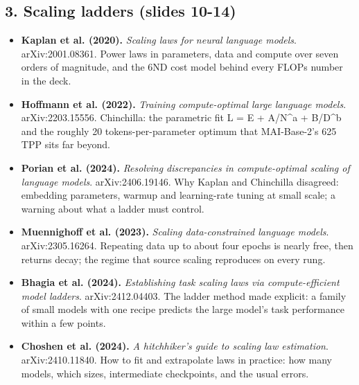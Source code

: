 \documentclass[11pt,letterpaper]{article}
\begin{document}
\subsection*{3. Scaling ladders (slides 10-14)}
\begin{itemize}[leftmargin=1.2em,itemsep=3pt]\sloppy
\item \textbf{Kaplan et al. (2020).} \textit{Scaling laws for neural language models}. arXiv:2001.08361. Power laws in parameters, data and compute over seven orders of magnitude, and the 6ND cost model behind every FLOPs number in the deck.
\item \textbf{Hoffmann et al. (2022).} \textit{Training compute-optimal large language models}. arXiv:2203.15556. Chinchilla: the parametric fit L = E + A/N\^{}a + B/D\^{}b and the roughly 20 tokens-per-parameter optimum that MAI-Base-2's 625 TPP sits far beyond.
\item \textbf{Porian et al. (2024).} \textit{Resolving discrepancies in compute-optimal scaling of language models}. arXiv:2406.19146. Why Kaplan and Chinchilla disagreed: embedding parameters, warmup and learning-rate tuning at small scale; a warning about what a ladder must control.
\item \textbf{Muennighoff et al. (2023).} \textit{Scaling data-constrained language models}. arXiv:2305.16264. Repeating data up to about four epochs is nearly free, then returns decay; the regime that source scaling reproduces on every rung.
\item \textbf{Bhagia et al. (2024).} \textit{Establishing task scaling laws via compute-efficient model ladders}. arXiv:2412.04403. The ladder method made explicit: a family of small models with one recipe predicts the large model's task performance within a few points.
\item \textbf{Choshen et al. (2024).} \textit{A hitchhiker's guide to scaling law estimation}. arXiv:2410.11840. How to fit and extrapolate laws in practice: how many models, which sizes, intermediate checkpoints, and the usual errors.
\end{itemize}
\end{document}
